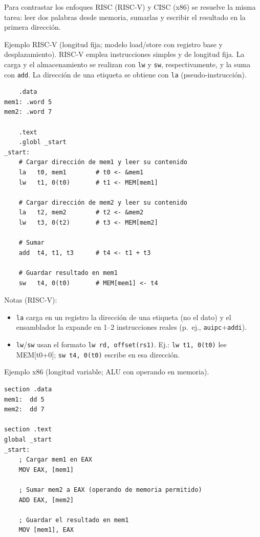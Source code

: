 \documentclass[12pt,oneside]{templates/unerthesis}
\begin{document}
Para contrastar los enfoques RISC (RISC‑V) y CISC (x86) se resuelve la misma tarea: leer dos palabras desde memoria, sumarlas y escribir el resultado en la primera dirección.

Ejemplo RISC‑V (longitud fija; modelo load/store con registro base y desplazamiento).
RISC‑V emplea instrucciones simples y de longitud fija. La carga y el almacenamiento se realizan con \texttt{lw} y \texttt{sw}, respectivamente, y la suma con \texttt{add}. La dirección de una etiqueta se obtiene con \texttt{la} (pseudo‑instrucción).

\begin{lstlisting}
    .data
mem1: .word 5
mem2: .word 7

    .text
    .globl _start
_start:
    # Cargar dirección de mem1 y leer su contenido
    la   t0, mem1        # t0 <- &mem1
    lw   t1, 0(t0)       # t1 <- MEM[mem1]

    # Cargar dirección de mem2 y leer su contenido
    la   t2, mem2        # t2 <- &mem2
    lw   t3, 0(t2)       # t3 <- MEM[mem2]

    # Sumar
    add  t4, t1, t3      # t4 <- t1 + t3

    # Guardar resultado en mem1
    sw   t4, 0(t0)       # MEM[mem1] <- t4
  \end{lstlisting}

Notas (RISC‑V):

\begin{itemize}
\item
  \texttt{la} carga en un registro la dirección de una etiqueta (no el dato) y el ensamblador la expande en 1--2 instrucciones reales (p.~ej., \texttt{auipc}+\texttt{addi}).
\item
  \texttt{lw}/\texttt{sw} usan el formato \texttt{lw\ rd,\ offset(rs1)}. Ej.: \texttt{lw\ t1,\ 0(t0)} lee MEM{[}t0+0{]}; \texttt{sw\ t4,\ 0(t0)} escribe en esa dirección.
\end{itemize}

Ejemplo x86 (longitud variable; ALU con operando en memoria).

\begin{lstlisting}
section .data
mem1:  dd 5
mem2:  dd 7

section .text
global _start
_start:
    ; Cargar mem1 en EAX
    MOV EAX, [mem1]

    ; Sumar mem2 a EAX (operando de memoria permitido)
    ADD EAX, [mem2]

    ; Guardar el resultado en mem1
    MOV [mem1], EAX
  \end{lstlisting}
\end{document}
